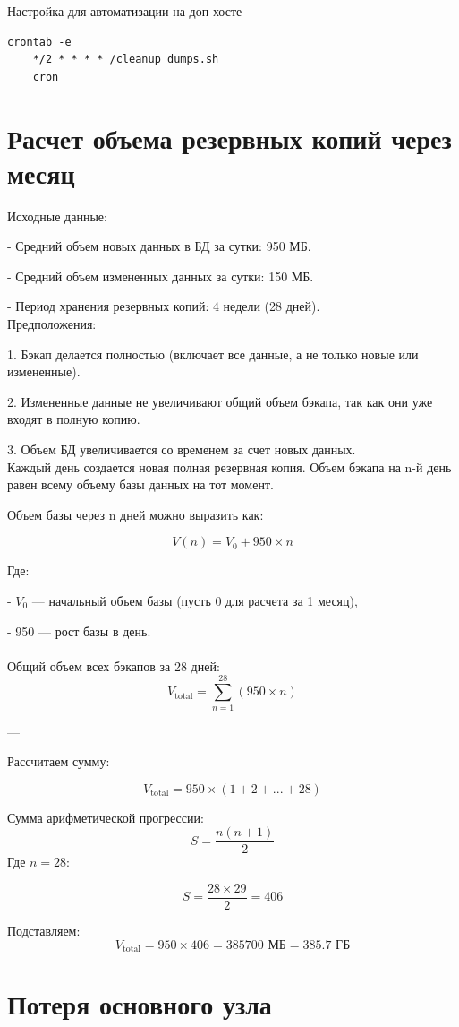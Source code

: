 \documentclass{article}
\begin{document}
Настройка для автоматизации на доп хосте
\begin{lstlisting}[caption={kitty}, label={lst:example}]
    crontab -e 
    */2 * * * * /cleanup_dumps.sh
    cron
\end{lstlisting}

\section*{Расчет объема резервных копий через месяц}

Исходные данные:

- Средний объем новых данных в БД за сутки: 950 МБ.

- Средний объем измененных данных за сутки: 150 МБ.

- Период хранения резервных копий: 4 недели (28 дней).
\\
Предположения:

1. Бэкап делается полностью (включает все данные, а не только новые или измененные).

2. Измененные данные не увеличивают общий объем бэкапа, так как они уже входят в полную копию.

3. Объем БД увеличивается со временем за счет новых данных.
\\
Каждый день создается новая полная резервная копия.  
Объем бэкапа на n-й день равен всему объему базы данных на тот момент.

Объем базы через n дней можно выразить как:

\[
V(n) = V_0 + 950 \times n
\]

Где:

- \( V_0 \) — начальный объем базы (пусть 0 для расчета за 1 месяц),

- 950 — рост базы в день.
\\ \\
Общий объем всех бэкапов за 28 дней:
\[
V_{\text{total}} = \sum_{n=1}^{28} (950 \times n)
\]

---

Рассчитаем сумму:

\[
V_{\text{total}} = 950 \times (1 + 2 + ... + 28)
\]

Сумма арифметической прогрессии:
\[
S = \frac{n (n+1)}{2}
\]
Где \( n = 28 \):

\[
S = \frac{28 \times 29}{2} = 406
\]

Подставляем:
\[
V_{\text{total}} = 950 \times 406 = 385 700 \text{ МБ} = 385.7 \text{ ГБ}
\]

\section*{Потеря основного узла}
\end{document}
